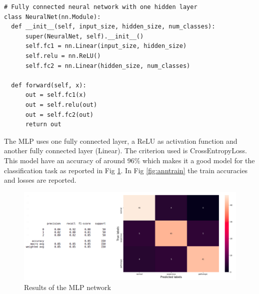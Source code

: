 \documentclass[a4paper,12pt]{article}
\begin{document}
\begin{Verbatim}[fontsize=\small]
# Fully connected neural network with one hidden layer
class NeuralNet(nn.Module):
  def __init__(self, input_size, hidden_size, num_classes):
      super(NeuralNet, self).__init__()
      self.fc1 = nn.Linear(input_size, hidden_size) 
      self.relu = nn.ReLU()
      self.fc2 = nn.Linear(hidden_size, num_classes)  
  
  def forward(self, x):
      out = self.fc1(x)
      out = self.relu(out)
      out = self.fc2(out)
      return out
\end{Verbatim}

\noindent The MLP uses one fully connected layer, a ReLU as activation function and another fully connected layer (Linear). The criterion used is CrossEntropyLoss. This model have an accuracy of around 96\% which makes it a good model for the classification task as reported in Fig \ref{fig:annres}. In Fig \ref{fig:anntrain} the train accuracies and losses are reported.

\begin{figure}[H]
  \begin{center}
  \includegraphics[width=1.0\textwidth]{images/ann_res.png}
  \end{center}
  \caption{Results of the MLP network}
  \label{fig:annres}
\end{figure}
\end{document}
